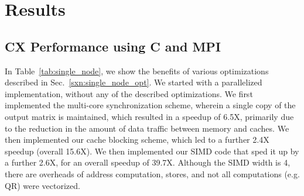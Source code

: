 \section{Results}
\label{sec:results}



\subsection{CX Performance using C and MPI} %
  \label{sxn:results1}


   

      In Table~\ref{tab:single_node}, we show the benefits of various
      optimizations described in
      Sec.~\ref{sxn:single_node_opt}. 
      We started with a parallelized implementation,
      without any of the described optimizations. %
      We first implemented the multi-core synchronization scheme, wherein a single copy of the
      output matrix is maintained, %
      which resulted in a speedup of 6.5X, primarily due to
      the reduction in the amount of data traffic between 
      memory and caches. 
      We then implemented our cache blocking scheme, which led to a
      further  2.4X speedup (overall 15.6X).
      We then implemented our SIMD code that sped it up by a further
      2.6X, for an overall speedup of 39.7X. Although the 
      SIMD width is 4, 
        there are overheads of address
        computation, stores, and not all computations (e.g. QR) were
        vectorized.



